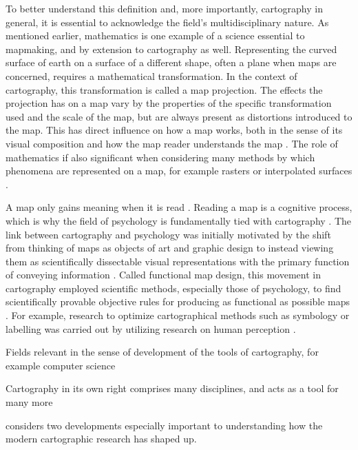 To better understand this definition and,
more importantly, cartography in general,
it is essential to acknowledge the field's multidisciplinary nature.
As mentioned earlier,
mathematics is one example of a science essential to mapmaking,
and by extension to cartography as well.
Representing the curved surface of earth  %
on a surface of a different shape, often a plane when maps are concerned,
requires a mathematical transformation.
In the context of cartography, this transformation is called a map projection.  %
The effects the projection has on a map vary by
the properties of the specific transformation used and the scale of the map,
but are always present as distortions introduced to the map.
This has direct influence on how a map works, both in the sense of
its visual composition and
how the map reader understands the map \parencite{ker2018}.
The role of mathematics if also significant
when considering many methods by which phenomena are represented on a map,
for example rasters or interpolated surfaces \parencite{fra2000}.


A map only gains meaning when it is read \parencite{gri2017}.
Reading a map is a cognitive process,
which is why the field of psychology is fundamentally tied with cartography
\parencite{mon2002}.
The link between cartography and psychology
was initially motivated by the shift from thinking of maps as
objects of art and graphic design to instead viewing
them as scientifically dissectable visual representations
with the primary function of conveying information \parencite{rob1952}.
Called functional map design,
this movement in cartography employed scientific methods,
especially those of psychology,
to find scientifically provable objective rules
for producing as functional as possible maps \parencite{mon2002}.
For example,
research to optimize cartographical methods such as symbology or labelling
was carried out by utilizing research on human perception \parencite{mac2004}.


Fields relevant in the sense of development of the tools of cartography,
for example computer science \parencite{mon1985}

Cartography in its own right comprises many disciplines,
and acts as a tool for many more

\parencite{kai2020}
\textcite{mac2004} considers two developments especially important
to understanding how the modern cartographic research has shaped up.


